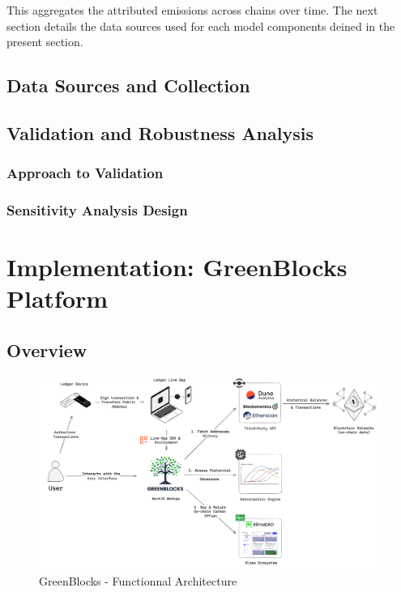 \documentclass[11pt]{report}
\begin{document}
This aggregates the attributed emissions across chains over time. The next section details the data sources used for each model components deined in the present section.


\section{Data Sources and Collection}
\section{Validation and Robustness Analysis}
\subsection{Approach to Validation}
\subsection{Sensitivity Analysis Design}

\chapter{Implementation: GreenBlocks Platform}
\section{Overview}
\begin{figure}[h!]
    \centering
    \centerline{\includegraphics[scale=0.08]{figures/functionnal architecture.png}}
    \caption{GreenBlocks - Functionnal Architecture}
    \label{fig:functionnal_architecture}
\end{figure}
\end{document}
